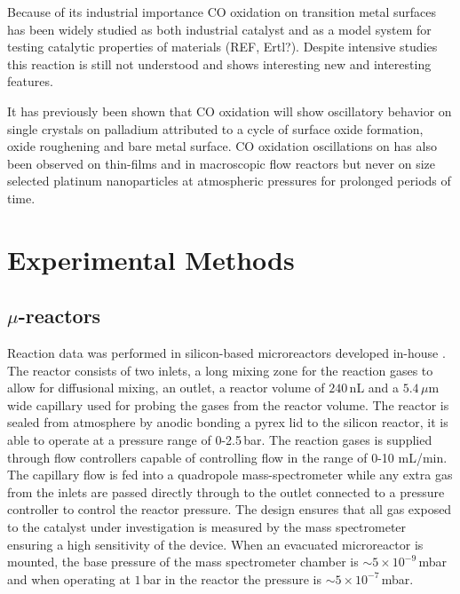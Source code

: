 \documentclass[8.5pt,twoside,twocolumn]{article}
\begin{document}



Because of its industrial importance CO oxidation on transition metal surfaces has been widely studied as both industrial catalyst and as a model system for testing catalytic properties of materials (REF, Ertl?). Despite intensive studies this reaction is still not understood and shows interesting new and interesting features. 

It has previously been shown that CO oxidation will show oscillatory behavior on single crystals on palladium \cite{Hendriksen2010} attributed to a cycle of surface oxide formation, oxide roughening and bare metal surface. CO oxidation oscillations on has also been observed on thin-films \cite{Lund2000} and in macroscopic flow reactors \cite{Singh2010} but never on size selected platinum nanoparticles at atmospheric pressures for prolonged periods of time.

\section{Experimental Methods}
\subsection{$\mu$-reactors}
Reaction data was performed in silicon-based microreactors developed in-house \cite{Henriksen2009}. The reactor consists of two inlets, a long mixing zone for the reaction gases to allow for diffusional mixing, an outlet, a reactor volume of $240\,$nL and a $5.4\,\mu$m wide capillary used for probing the gases from the reactor volume. The reactor is sealed from atmosphere by anodic bonding a pyrex lid to the silicon reactor, it is able to operate at a pressure range of 0-2.5\,bar. The reaction gases is supplied through flow controllers capable of controlling flow in the range of 0-10 mL/min. The capillary flow is fed into a quadropole mass-spectrometer while any extra gas from the inlets are passed directly through to the outlet connected to a pressure controller to control the reactor pressure. The design ensures that all gas exposed to the catalyst under investigation is measured by the mass spectrometer ensuring a high sensitivity of the device. When an evacuated microreactor is mounted, the base pressure of the mass spectrometer chamber is $\sim5\times10^{-9}\,$mbar and when operating at $1\,$bar in the reactor the pressure is $\sim5\times10^{-7}\,$mbar.
\end{document}
